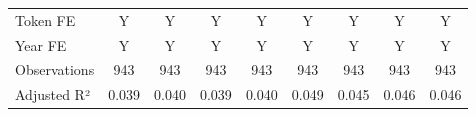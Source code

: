 {\begin{tabular}{l*{8}{c}}
\midrule
Token FE            &           Y         &           Y         &           Y         &           Y         &           Y         &           Y         &           Y         &           Y         \\
Year FE             &           Y         &           Y         &           Y         &           Y         &           Y         &           Y         &           Y         &           Y         \\
Observations        &         943         &         943         &         943         &         943         &         943         &         943         &         943         &         943         \\
Adjusted R²         &       0.039         &       0.040         &       0.039         &       0.040         &       0.049         &       0.045         &       0.046         &       0.046         \\
\bottomrule
\end{tabular}
}
